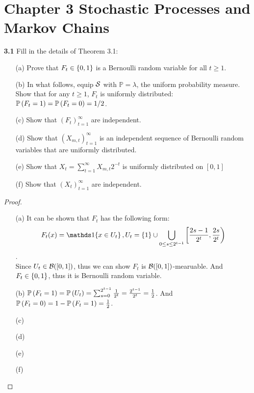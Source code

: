 
\chapter*{Chapter 3 Stochastic Processes and Markov Chains}
\label{sec:second}

\noindent\textbf{3.1} Fill in the details of Theorem 3.1:


\begin{enumerate}
   \item[(a)] Prove that $F_t \in \left\{ 0,1 \right\}$ is a Bernoulli random variable for all $t \ge 1$.
   \item[(b)] In what follows, equip $\mathcal{S}$ with $\mathbb{P}=\lambda$, the uniform probability measure. Show that for any $t \ge 1$, $F_t$ is uniformly distributed: $\mathbb{P} \left(F_t= 1 \right) = \mathbb{P} \left(F_t = 0\right) = 1/2$. 
   \item[(c)] Show that $(F_t)_{t=1}^{\infty}$ are independent.
   \item[(d)] Show that $(X_{m,t})_{t=1}^\infty$ is an independent sequence of Bernoulli random variables that are uniformly distributed.
   \item[(e)] Show that $X_t = \sum_{t=1}^\infty X_{m,t}2^{-t}$ is uniformly distributed on $[0,1]$
   \item[(f)] Show that $(X_t)_{t=1}^\infty$ are independent.
\end{enumerate}

\begin{proof}
    \begin{enumerate}
   \item[(a)] It can be shown that $F_t$ has the following form: 
   $$F_t(x) = \bOne{x\in U_t}, U_t = \set{1} \cup \bigcup_{0 \le s\le 2^{t-1}}\left[\frac{2s-1}{2^t}, \frac{2s}{2^t}\right)$$. \\
   Since $U_t \in \mathcal{B}([0,1])$, thus we can show $F_t$ is $\mathcal{B}([0,1])$-mearuable. And $F_t \in \left\{ 0,1 \right\}$, thus it is Bernoulli random variable. 
   \item[(b)] $\mathbb{P} \left(F_t = 1\right) = \mathbb{P} \left(U_t\right) = \sum_{s=0}^{2^{t-1}}\frac{1}{2^t} =\frac{2^{t-1}}{2^t} =\frac{1}{2}$. And $\mathbb{P} \left(F_t = 0\right) = 1-\mathbb{P} \left(F_t = 1\right)=\frac{1}{2}$.
   \item[(c)] 
   \item[(d)] 
   \item[(e)] 
   \item[(f)] 
\end{enumerate}
\end{proof}




